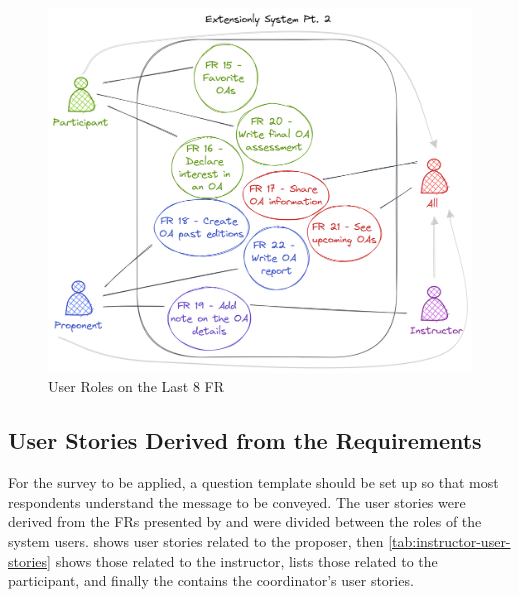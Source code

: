 \begin{figure}[!htb]
  \caption{User Roles on the Last 8 \ac{FR}}\label{fig:use-case-2}
  \begin{center}
    \includegraphics[width=12cm]{img/6-use-case-2.png}
  \end{center}
\end{figure}

\subsection{User Stories Derived from the Requirements}

For the survey to be applied, a question template should be set up so that most respondents understand the message to be conveyed. The user stories were derived from the \aclp{FR} presented by  and were divided between the roles of the system users.  shows user stories related to the proposer, then \cref{tab:instructor-user-stories} shows those related to the instructor,  lists those related to the participant, and finally the  contains the coordinator's user stories.

